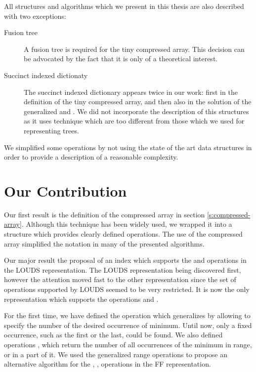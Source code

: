 \bigbreak

All structures and algorithms which we present in this thesis are also described with two exceptions:
\begin{description}
	\item[Fusion tree]
	A fusion tree is required for the tiny compressed array.
	This decision can be advocated by the fact that it is only of a theoretical interest.
	
	\item[Succinct indexed dictionaty]
	The succinct indexed dictionary appears twice in our work: first in the definition of the tiny compressed array, and then also in the solution of the generalized \rmqSize{} and \rmqSelect{}.
	We did not incorporate the description of this structures as it uses technique which are too different from those which we used for representing trees.
\end{description}

We simplified some operations by not using the state of the art data structures in order to provide a description of a reasonable complexity.

\section*{Our Contribution}

Our first result is the definition of the compressed array in section \ref{s:compressed-array}.
Although this technique has been widely used, we wrapped it into a structure which provides clearly defined operations.
The use of the compressed array simplified the notation in many of the presented algorithms.

Our major result the proposal of an index which supports the \dep{} and \levelAny{} operations in the LOUDS representation.
The LOUDS representation being discovered first, however the attention moved fast to the other representation since the set of operations supported by LOUDS seemed to be very restricted.
It is now the only representation which supports the operations \levelRank{} and \levelSelect{}.

For the first time, we have defined the operation \rmqSelect{} which generalizes \rmqi{} by allowing to specify the number of the desired occurrence of minimum.
Until now, only a fixed occurrence, such as the first or the last, could be found.
We also defined operations \rmqSize{}, \rmqRank{} which return the number of all occurrences of the minimum in range, or in a part of it.
We used the generalized range operations to propose an alternative algorithm for the \degree{}, \childRank{}, \childSelect{} operations in the FF representation.

